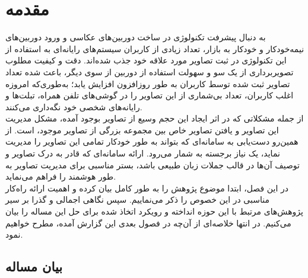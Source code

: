 \chapter{مقدمه}
به دنبال پیشرفت تکنولوژی در ساخت دوربین‌های عکاسی و ورود دوربین‌های نیمه‌خودکار و خودکار به بازار، تعداد زیادی از کاربران سیستم‌های رایانه‌ای به استفاده از این تکنولوژی در ثبت تصاویر مورد علاقه خود جذب شده‌اند. دقت و کیفیت مطلوب تصویربرداری از یک سو و سهولت استفاده از دوربین‌ از سوی دیگر، باعث شده‌ تعداد تصاویر ثبت شده توسط کاربران به طور روزافزون افزایش یابد؛ به‌طوری‌که امروزه اغلب کاربران، تعداد بی‌شماری از این تصاویر را در گوشی‌های تلفن همراه، تبلت‌ها و رایانه‌های شخصی خود نگه‌داری می‌کنند.
\\
از جمله مشکلاتی که در اثر ایجاد این حجم وسیع از تصاویر بوجود آمده، مشکل مدیریت این تصاویر و یافتن تصاویر خاص بین مجموعه بزرگی از تصاویر موجود، است. از همین‌رو دست‌یابی به سامانه‌ای که بتواند به طور خودکار تمامی این تصاویر را مدیریت نماید، یک نیاز برجسته به شمار می‌رود. ارائه سامانه‌ای که قادر به درک تصاویر و توصیف آن‌ها در قالب جملات زبان طبیعی باشد، بستر مناسبی برای مدیریت تصاویر به طور هوشمند را فراهم می‌نماید.
\\
در این فصل، ابتدا موضوع پژوهش را به طور کامل بیان کرده و اهمیت ارائه راه‌کار مناسبی در این خصوص را ذکر می‌نماییم. سپس نگاهی اجمالی و گذرا بر سیر پژوهش‌های مرتبط با این حوزه انداخته و رویکرد اتخاذ شده برای حل این مساله را بیان می‌کنیم. در انتها خلاصه‌ای از آن‌چه در فصول بعدی این گزارش آمده، مطرح خواهیم نمود.
\section{بیان مساله}

